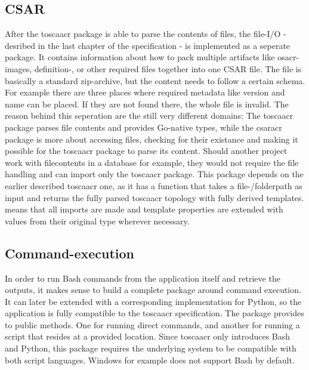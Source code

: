 

\subsection{CSAR}
After the \gls{toscaacr} package is able to parse the contents of files, the file-I/O - desribed in the last chapter of the specification -  is implemented as a seperate package. It contains information about how to pack multiple artifacts like \gls{osacr}-images, definition-, or other required files together into one CSAR file. The file is basically a standard zip-archive, but the content needs to follow a certain schema. For example there are three places where required metadata like version and name can be placed. If they are not found there, the whole file is invalid.
\newline
The reason behind this seperation are the still very different domains: The \gls{toscaacr} package parses file contents and provides Go-native types, while the \gls{csaracr} package is more about accessing files, checking for their existance and making it possible for the \gls{toscaacr} package to parse its content. Should another project work with filecontents in a database for example, they would not require the file handling and can import only the \gls{toscaacr} package.
\newline
This package depends on the earlier described \gls{toscaacr} one, as it has a function that takes a file-/folderpath as input and returns the fully parsed \gls{toscaacr} topology with fully derived templates.  means that all imports are made and template properties are extended with values from their original type wherever necessary.


\subsection{Command-execution}
In order to run Bash commands from the application itself and retrieve the outputs, it makes sense to build a complete package around command execution. It can later be extended with a corresponding implementation for Python, so the application is fully compatible to the \gls{toscaacr} specification.
\newline
The package provides to public methods. One for running direct commands, and another for running a script that resides at a provided location.
\newline
Since \gls{toscaacr} only introduces Bash and Python, this package requires the underlying system to be compatible with both script languages. Windows for example does not support Bash by default.


